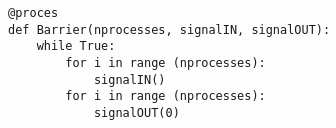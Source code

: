\begin{lstlisting}[float, label=barrier-imp,caption=En barriere i \pycsp]
@proces
def Barrier(nprocesses, signalIN, signalOUT):
	while True:
		for i in range (nprocesses):
			signalIN()
		for i in range (nprocesses):
			signalOUT(0)
\end{lstlisting}
%
%
%

